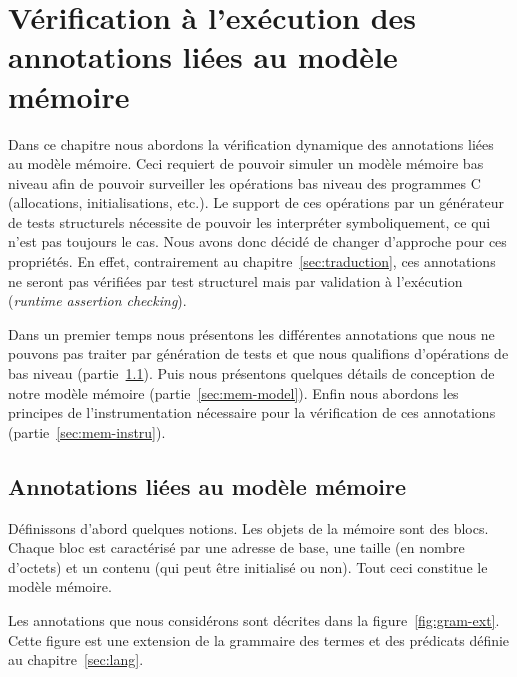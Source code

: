
\chapter[Vérification liée au modèle mémoire]{Vérification à l'exécution des annotations liées au modèle mémoire}
\label{sec:runtime}

\chapterintro

Dans ce chapitre nous abordons la vérification dynamique des annotations liées
au modèle mémoire.
Ceci requiert de pouvoir simuler un modèle mémoire bas niveau afin de pouvoir
surveiller les opérations bas niveau des programmes C (allocations,
initialisations, etc.).
Le support de ces opérations par un générateur de tests structurels nécessite
de pouvoir les interpréter symboliquement, ce qui n'est pas toujours le cas.
Nous avons donc décidé de changer d'approche pour ces propriétés.
En effet, contrairement au chapitre~\ref{sec:traduction}, ces annotations ne
seront pas vérifiées par test structurel mais par validation à l'exécution
({\em runtime assertion checking}).

Dans un premier temps nous présentons les différentes annotations que nous ne
pouvons pas traiter par génération de tests et que nous qualifions d'opérations
de bas niveau (partie~\ref{sec:mem-annots}).
Puis nous présentons quelques détails de conception de notre modèle mémoire
(partie~\ref{sec:mem-model}).
Enfin nous abordons les principes de l'instrumentation nécessaire pour la
vérification de ces annotations (partie~\ref{sec:mem-instru}).


\section{Annotations liées au modèle mémoire}
\label{sec:mem-annots}


Définissons d'abord quelques notions.
Les objets de la mémoire sont des blocs.
Chaque bloc est caractérisé par une adresse de base, une taille (en nombre
d'octets) et un contenu (qui peut être initialisé ou non).
Tout ceci constitue le modèle mémoire.

Les annotations \eacsl que nous considérons sont décrites dans la
figure~\ref{fig:gram-ext}.
Cette figure est une extension de la grammaire des termes et des prédicats
\eacsl définie au chapitre~\ref{sec:lang}.


